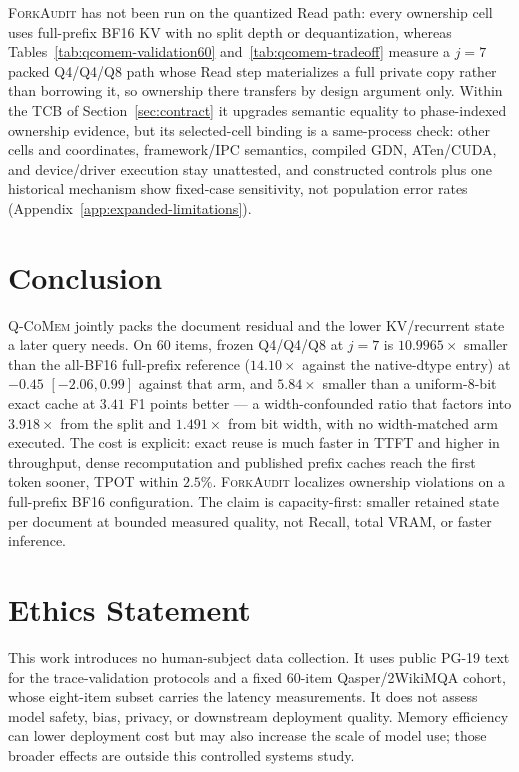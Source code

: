 \documentclass{article}
\newcommand{\qcomem}{\textsc{Q-CoMem}}
\newcommand{\method}{\textsc{ForkAudit}}
\begin{document}
\method{} has not been run on the quantized Read path: every ownership cell uses
full-prefix BF16 KV with no split depth or dequantization, whereas
Tables~\ref{tab:qcomem-validation60} and~\ref{tab:qcomem-tradeoff} measure a
$j=7$ packed Q4/Q4/Q8 path whose Read step materializes a full private copy
rather than borrowing it, so ownership there transfers by design argument only.
Within the TCB of Section~\ref{sec:contract} it upgrades semantic equality to
phase-indexed ownership evidence, but its selected-cell binding is a
same-process check: other cells and coordinates, framework/IPC semantics,
compiled GDN, ATen/CUDA, and device/driver execution stay unattested, and
constructed controls plus one historical mechanism show fixed-case sensitivity,
not population error rates (Appendix~\ref{app:expanded-limitations}).

\FloatBarrier

\section{Conclusion}

\qcomem{} jointly packs the document residual and the lower KV/recurrent state a
later query needs.  On 60 items, frozen Q4/Q4/Q8 at $j=7$ is $10.9965\times$
smaller than the all-BF16 full-prefix reference ($14.10\times$ against the
native-dtype entry) at $-0.45$ $[-2.06,0.99]$ against that arm, and
$5.84\times$ smaller than a uniform-8-bit exact cache at $3.41$ F1 points better
--- a width-confounded ratio that factors into $3.918\times$ from the split and
$1.491\times$ from bit width, with no width-matched arm executed.  The cost is
explicit: exact reuse is much faster in TTFT and higher in throughput, dense
recomputation and published prefix caches reach the first token sooner, TPOT
within $2.5\%$.  \method{} localizes ownership violations on a full-prefix BF16
configuration.  The claim is capacity-first: smaller retained state per document
at bounded measured quality, not Recall, total VRAM, or faster inference.

\section*{Ethics Statement}
This work introduces no human-subject data collection. It uses public PG-19 text
for the trace-validation protocols and a fixed 60-item Qasper/2WikiMQA cohort,
whose eight-item subset carries the latency measurements. It does not assess
model safety, bias, privacy, or downstream deployment quality. Memory efficiency
can lower deployment cost but may also increase the scale of model use; those
broader effects are outside this controlled systems study.
\end{document}
